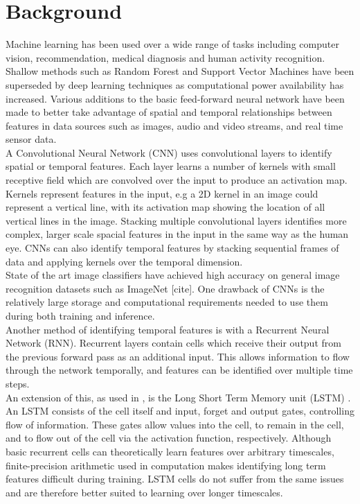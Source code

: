 \chapter{Background}

Machine learning has been used over a wide range of tasks including computer vision, recommendation, medical diagnosis and human activity recognition. Shallow methods such as Random Forest and Support Vector Machines have been superseded by deep learning techniques as computational power availability has increased. Various additions to the basic feed-forward neural network have been made to better take advantage of spatial and temporal relationships between features in data sources such as images, audio and video streams, and real time sensor data.\\

A Convolutional Neural Network (CNN) \cite{Neocognitron} uses convolutional layers to identify spatial or temporal features. Each layer learns a number of kernels with small receptive field which are convolved over the input to produce an activation map. Kernels represent features in the input, e.g a 2D kernel in an image could represent a vertical line, with its activation map showing the location of all vertical lines in the image. Stacking multiple convolutional layers identifies more complex, larger scale spacial features in the input in the same way as the human eye. CNNs can also identify temporal features by stacking sequential frames of data and applying kernels over the temporal dimension.\\

State of the art image classifiers have achieved high accuracy on general image recognition datasets such as ImageNet [cite]. One drawback of CNNs is the relatively large storage and computational requirements needed to use them during both training and inference.\\

Another method of identifying temporal features is with a Recurrent Neural Network (RNN). Recurrent layers contain cells which receive their output from the previous forward pass as an additional input. This allows information to flow through the network temporally, and features can be identified over multiple time steps.\\

An extension of this, as used in \cite{DeepConvLSTM}, is the Long Short Term Memory unit (LSTM) \cite{LSTM}. An LSTM consists of the cell itself and input, forget and output gates, controlling flow of information. These gates allow values into the cell, to remain in the cell, and to flow out of the cell via the activation function, respectively. Although basic recurrent cells can theoretically learn features over arbitrary timescales, finite-precision arithmetic used in computation makes identifying long term features difficult during training. LSTM cells do not suffer from the same issues and are therefore better suited to learning over longer timescales.\\


